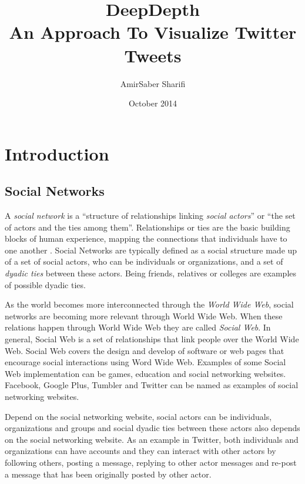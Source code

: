 \documentclass[a4paper,11pt]{report}
\title{DeepDepth \\ An Approach To Visualize Twitter Tweets}
\author{AmirSaber Sharifi}
\date{October 2014}
\begin{document}
\maketitle

\tableofcontents

\listoffigures

\chapter{Introduction}

\section{Social Networks}

A \emph{social network} is a “structure of relationships linking \emph{social actors}” or “the set of actors and the ties among them”\cite{stankath}. Relationships or ties are the basic building blocks of human experience, mapping the connections that individuals have to one another \cite{pescosolido}\cite{socialnetworkdef}. Social Networks are typically defined as a social structure made up of a set of social actors, who can be individuals or organizations, and a set of \emph{dyadic ties} between these actors. Being friends, relatives or colleges are examples of possible dyadic ties.

As the world becomes more interconnected through the \emph{World Wide Web}, social networks are becoming more relevant through World Wide Web. When these relations happen through World Wide Web they are called \emph{Social Web}. In general, Social Web is a set of relationships that link people over the World Wide Web\cite{socialwebw3}. Social Web covers the design and develop of software or web pages that encourage social interactions using Word Wide Web. Examples of some Social Web implementation can be games, education and social networking websites. Facebook, Google Plus, Tumbler and Twitter can be named as examples of social networking websites.

Depend on the social networking website, social actors can be individuals, organizations and groups and social dyadic ties between these actors also depends on the social networking website. As an example in Twitter, both individuals and organizations can have accounts and they can interact with other actors by following others, posting a message, replying to other actor messages and re-post a message that has been originally posted by other actor.
\end{document}
